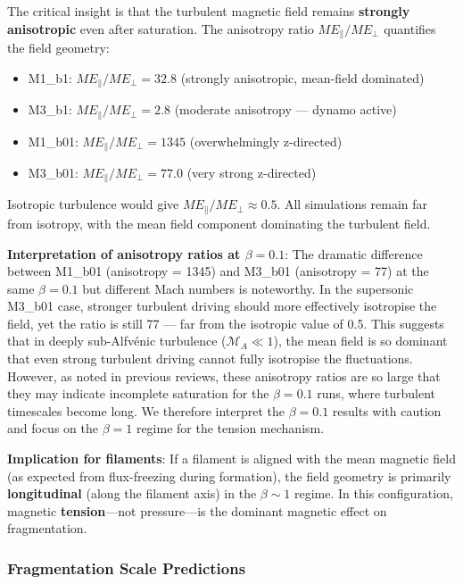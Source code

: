\documentclass[11pt,a4paper]{article}
\begin{document}
The critical insight is that the turbulent magnetic field remains \textbf{strongly anisotropic} even after saturation. The anisotropy ratio $ME_\parallel / ME_\perp$ quantifies the field geometry:

\begin{itemize}
    \item M1\_b1: $ME_\parallel/ME_\perp = 32.8$ (strongly anisotropic, mean-field dominated)
    \item M3\_b1: $ME_\parallel/ME_\perp = 2.8$ (moderate anisotropy — dynamo active)
    \item M1\_b01: $ME_\parallel/ME_\perp = 1345$ (overwhelmingly z-directed)
    \item M3\_b01: $ME_\parallel/ME_\perp = 77.0$ (very strong z-directed)
\end{itemize}

Isotropic turbulence would give $ME_\parallel/ME_\perp \approx 0.5$. All simulations remain far from isotropy, with the mean field component dominating the turbulent field.

\textbf{Interpretation of anisotropy ratios at $\beta = 0.1$}: The dramatic difference between M1\_b01 (anisotropy = 1345) and M3\_b01 (anisotropy = 77) at the same $\beta = 0.1$ but different Mach numbers is noteworthy. In the supersonic M3\_b01 case, stronger turbulent driving should more effectively isotropise the field, yet the ratio is still 77 — far from the isotropic value of 0.5. This suggests that in deeply sub-Alfv\'enic turbulence ($\mathcal{M}_A \ll 1$), the mean field is so dominant that even strong turbulent driving cannot fully isotropise the fluctuations. However, as noted in previous reviews, these anisotropy ratios are so large that they may indicate incomplete saturation for the $\beta = 0.1$ runs, where turbulent timescales become long. We therefore interpret the $\beta = 0.1$ results with caution and focus on the $\beta = 1$ regime for the tension mechanism.

\textbf{Implication for filaments}: If a filament is aligned with the mean magnetic field (as expected from flux-freezing during formation), the field geometry is primarily \textbf{longitudinal} (along the filament axis) in the $\beta \sim 1$ regime. In this configuration, magnetic \textbf{tension}—not pressure—is the dominant magnetic effect on fragmentation.

\subsubsection{Fragmentation Scale Predictions}
\end{document}
